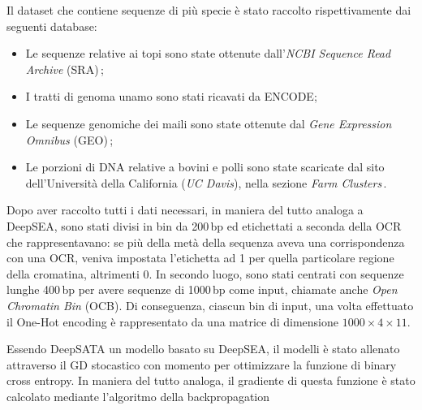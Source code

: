 Il dataset che contiene sequenze di più specie è stato raccolto rispettivamente dai seguenti database:
\begin{itemize}
    \item Le sequenze relative ai topi sono state ottenute dall'\textit{\acs{NCBI} Sequence Read Archive} (\acs{SRA})\,\cite{ncbisra};
    \item I tratti di genoma unamo sono stati ricavati da \acs{ENCODE};
    \item Le sequenze genomiche dei maili sono state ottenute dal \textit{Gene Expression Omnibus} (\acs{GEO})\,\cite{ncbigeo};
    \item Le porzioni di \acs{DNA} relative a bovini e polli sono state scaricate dal sito dell'Università della California (\textsl{UC Davis}), nella sezione \textit{Farm Clusters}\,\cite{ucdavis}.
\end{itemize} 
% 
\noindent Dopo aver raccolto tutti i dati necessari, in maniera del tutto analoga a DeepSEA, sono stati divisi in bin da 200\,bp ed etichettati a seconda della \acs{OCR} che rappresentavano: se più della metà della sequenza aveva una corrispondenza con una \acs{OCR}, veniva impostata l'etichetta ad 1 per quella particolare regione della cromatina, altrimenti 0. In secondo luogo, sono stati centrati con sequenze lunghe 400\,bp per avere sequenze di 1000\,bp come input, chiamate anche \textit{Open Chromatin Bin} (\acs{OCB}). Di conseguenza, ciascun bin di input, una volta effettuato il One-Hot encoding è rappresentato da una matrice di dimensione $1000 \times 4 \times 11$.

Essendo DeepSATA un modello basato su DeepSEA, il modelli è stato allenato attraverso il \acs{GD} stocastico con momento per ottimizzare la funzione di binary cross entropy. In maniera del tutto analoga, il gradiente di questa funzione è stato calcolato mediante l'algoritmo della backpropagation


